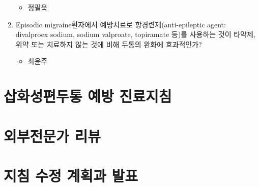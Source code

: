 \documentclass[]{book}
\providecommand{\tightlist}{%
  \setlength{\itemsep}{0pt}\setlength{\parskip}{0pt}}
\begin{document}
\begin{enumerate}
  \begin{itemize}
  \tightlist
  \item
    정필욱
  \end{itemize}
\item
  Episodic migraine환자에서 예방치료로 항경련제(anti-epileptic agent: divalproex sodium, sodium valproate, topiramate 등)를 사용하는 것이 타약제, 위약 또는 치료하지 않는 것에 비해 두통의 완화에 효과적인가?

  \begin{itemize}
  \tightlist
  \item
    최윤주
  \end{itemize}
\end{enumerate}

\hypertarget{section-25}{%
\chapter{삽화성편두통 예방 진료지침}\label{section-25}}

\hypertarget{section-26}{%
\chapter{외부전문가 리뷰}\label{section-26}}

\hypertarget{section-27}{%
\chapter{지침 수정 계획과 발표}\label{section-27}}


\end{document}
